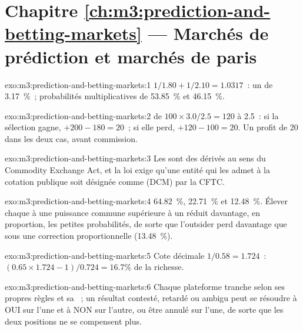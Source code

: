 \section*{Chapitre \ref{ch:m3:prediction-and-betting-markets} --- Marchés de prédiction et marchés de paris}

\begin{solution}{exo:m3:prediction-and-betting-markets:1}
$1/1.80 + 1/2.10 = 1.0317$~: un  de 3.17~\%~; probabilités multiplicatives de 53.85~\% et 46.15~\%.
\end{solution}

\begin{solution}{exo:m3:prediction-and-betting-markets:2}
 de $100 \times 3.0/2.5 = 120$ à 2.5~: si la sélection gagne, $+200 - 180 = 20$~; si elle perd, $+120 - 100 = 20$. Un profit de 20 dans les deux cas, avant
commission.
\end{solution}

\begin{solution}{exo:m3:prediction-and-betting-markets:3}
Les  sont des dérivés au sens du Commodity Exchange Act, et la loi exige qu'une entité qui les admet à la cotation publique soit
désignée comme  (DCM) par la CFTC.
\end{solution}

\begin{solution}{exo:m3:prediction-and-betting-markets:4}
64.82~\%, 22.71~\% et 12.48~\%. Élever chaque  à une puissance commune supérieure à un réduit davantage, en proportion, les petites probabilités, de sorte que
l'outsider perd davantage que sous une correction proportionnelle (13.48~\%).
\end{solution}

\begin{solution}{exo:m3:prediction-and-betting-markets:5}
Cote décimale $1/0.58 = 1.724$~: $(0.65 \times 1.724 - 1)/0.724 = 16.7\%$ de la richesse.
\end{solution}

\begin{solution}{exo:m3:prediction-and-betting-markets:6}
Chaque plateforme tranche selon ses propres règles et sa ~; un résultat contesté, retardé ou ambigu peut se résoudre à OUI sur l'une et à NON sur l'autre, ou être annulé sur l'une, de sorte que
les deux positions ne se compensent plus.
\end{solution}

